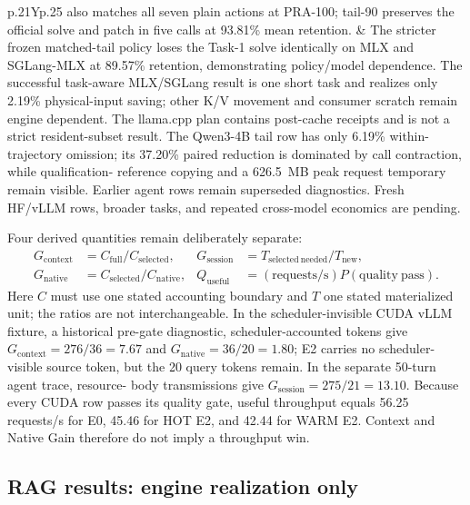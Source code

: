 \documentclass[11pt]{article}
\begin{document}
\begin{table}[H]
\begin{tabularx}{\linewidth}{p{.21\linewidth}Yp{.25\linewidth}}
also matches all seven plain actions at PRA-100; tail-90 preserves the official
solve and patch in five calls at 93.81\% mean retention. & The stricter frozen matched-tail
policy loses the Task-1 solve identically on MLX and SGLang-MLX at 89.57\%
retention, demonstrating policy/model dependence.  The successful task-aware
MLX/SGLang result is one short task and realizes only 2.19\% physical-input saving; other K/V
movement and consumer scratch remain engine dependent.  The llama.cpp plan
contains post-cache receipts and is not a strict resident-subset result.
The Qwen3-4B tail row has only 6.19\% within-trajectory omission; its 37.20\%
paired reduction is dominated by call contraction, while qualification-
reference copying and a 626.5~MB peak request temporary remain visible.  Earlier
agent rows remain superseded diagnostics.  Fresh HF/vLLM rows, broader tasks,
and repeated cross-model economics are pending. \\
\bottomrule
\end{tabularx}
\caption{Four-claim evidence map.  Passing a mechanism gate does not silently
promote task utility, portability, zero-copy behavior, or runtime benefit.}
\label{tab:four-claim-evidence}
\end{table}

Four derived quantities remain deliberately separate:
\begin{align}
G_{\mathrm{context}}&=C_{\mathrm{full}}/C_{\mathrm{selected}}, &
G_{\mathrm{session}}&=T_{\mathrm{selected\ needed}}/T_{\mathrm{new}},\\
G_{\mathrm{native}}&=C_{\mathrm{selected}}/C_{\mathrm{native}}, &
Q_{\mathrm{useful}}&=(\mathrm{requests/s})P(\mathrm{quality\ pass}).
\end{align}
Here $C$ must use one stated accounting boundary and $T$ one stated materialized
unit; the ratios are not interchangeable. In the scheduler-invisible CUDA
vLLM fixture, a historical pre-gate diagnostic, scheduler-accounted tokens give
$G_{\mathrm{context}}=276/36=7.67$ and
$G_{\mathrm{native}}=36/20=1.80$; E2 carries no scheduler-visible source token,
but the 20 query tokens remain. In the separate 50-turn agent trace, resource-
body transmissions give $G_{\mathrm{session}}=275/21=13.10$. Because every
CUDA row passes its quality gate, useful throughput equals 56.25 requests/s for
E0, 45.46 for HOT E2, and 42.44 for WARM E2. Context and Native Gain therefore
do not imply a throughput win.

\subsection{RAG results: engine realization only}
\end{document}
